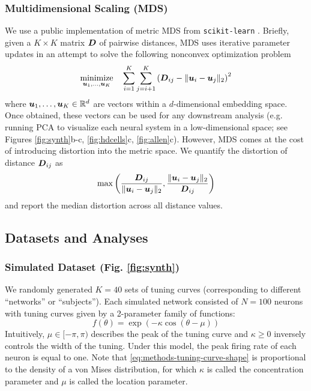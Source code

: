 \subsubsection{Multidimensional Scaling (MDS)}

We use a public implementation of metric MDS from \texttt{scikit-learn} \parencite{scikit}.
Briefly, given a $K \times K$ matrix $\boldsymbol{D}$ of pairwise distances, MDS uses iterative parameter updates in an attempt to solve the following nonconvex optimization problem
\begin{equation}
\underset{\boldsymbol{u}_1, \dots, \boldsymbol{u}_K}{\text{minimize}} \quad \sum_{i=1}^K \sum_{j=i+1}^K \left ( \boldsymbol{D}_{ij} -  \Vert \boldsymbol{u}_i - \boldsymbol{u}_j \Vert_2 \right )^2
\end{equation}
where $\boldsymbol{u}_1, \dots, \boldsymbol{u}_K \in \mathbb{R}^d$ are vectors within a $d$-dimensional embedding space.
Once obtained, these vectors can be used for any downstream analysis (e.g. running PCA to visualize each neural system in a low-dimensional space; see Figures \ref{fig:synth}b-c, \ref{fig:hdcells}c, \ref{fig:allen}c). 
However, MDS comes at the cost of introducing distortion into the metric space. 
We quantify the distortion of distance $\boldsymbol{D}_{ij}$ as
\begin{equation}
\max \left ( \frac{\boldsymbol{D}_{ij}}{\Vert \boldsymbol{u}_i - \boldsymbol{u}_j \Vert_2}, \frac{\Vert \boldsymbol{u}_i - \boldsymbol{u}_j \Vert_2}{\boldsymbol{D}_{ij}} \right ) 
\end{equation}
and report the median distortion across all distance values.

\subsection{Datasets and Analyses}

\subsubsection{Simulated Dataset (Fig. \ref{fig:synth})}

We randomly generated $K = 40$ sets of tuning curves (corresponding to different ``networks'' or ``subjects'').
Each simulated network consisted of $N = 100$ neurons with tuning curves given by a 2-parameter family of functions:
\begin{equation}
\label{eq:methods-tuning-curve-shape}
f(\theta) = \exp \left ( -\kappa \cos (\theta - \mu)\right )
\end{equation}
Intuitively, $\mu \in [-\pi, \pi)$ describes the peak of the tuning curve and $\kappa \geq 0$ inversely controls the width of the tuning.
Under this model, the peak firing rate of each neuron is equal to one.
Note that \cref{eq:methods-tuning-curve-shape} is proportional to the density of a von Mises distribution, for which $\kappa$ is called the concentration parameter and $\mu$ is called the location parameter.

